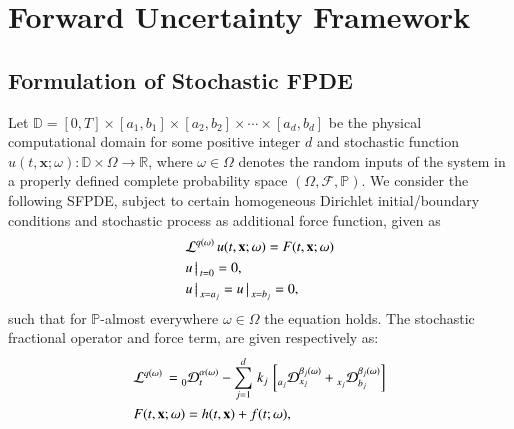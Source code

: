 %
\section{Forward Uncertainty Framework}
\label{Sec: Uncertainty framework}
%


%
%
\subsection{Formulation of Stochastic FPDE}
\label{Sec: Problem Definition}
%
%
Let $\mathbb{D} = [0,T] \times [a_1,b_1] \times [a_2,b_2] \times \cdots \times [a_d,b_d]$ be the physical computational domain for some positive integer $d$ and stochastic function $u(t,\textbf{x};\omega): \mathbb{D} \times \Omega \rightarrow \mathbb{R}$, where $\omega \in \Omega$ denotes the random inputs of the system in a properly defined complete probability space $(\Omega, \mathcal{F},\mathbb{P})$. We consider the following SFPDE, subject to certain homogeneous Dirichlet initial/boundary conditions and stochastic process as additional force function, given as
%
\begin{align}
\label{Eq: Stochastic FPDE}
%
&
\mathcal{L}^{q(\omega)} \, u(t,\textbf{x};\omega) = F(t,\textbf{x};\omega)
\\
\label{Eq: IC}
& u \big\arrowvert_{t=0} = 0 ,  
%
\\
\label{Eq: BC}
& u \big\arrowvert_{x=a_j} = u \big\arrowvert_{x=b_j} = 0 , 
%
\end{align}
%
such that for $\mathbb{P}$-almost everywhere $\omega \in \Omega $ the equation holds. The stochastic fractional operator and force term, are given respectively as:
%
\begin{align}
\label{Eq: Stochastic Fractional Operator}
%
&
\mathcal{L}^{q(\omega)} \, = 
\prescript{}{0}{\mathcal{D}}_{t}^{\alpha(\omega)}
- \sum_{j=1}^{d} \, k_{j} \,\left[ \prescript{}{a_j}{\mathcal{D}}_{x_j}^{\beta_j(\omega)}
+ \prescript{}{x_j}{\mathcal{D}}_{b_j}^{\beta_j(\omega)} \right]
\\
& 
F(t,\textbf{x};\omega) = h(t,\textbf{x}) +  f(t;\omega) ,
%
\end{align}
